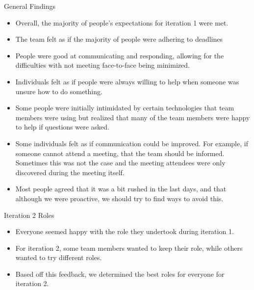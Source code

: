 \documentclass[final,hyperref={pdfpagelabels=false}]{beamer}
\begin{document}
\begin{frame}[t]
\begin{columns}[t]
\begin{column}{.465\textwidth}

\begin{block}{General Findings}

\begin{itemize}
\item Overall, the majority of people's expectations for iteration 1 were met.
\item The team felt as if the majority of people were adhering to deadlines
\item People were good at communicating and responding, allowing for the difficulties with not meeting face-to-face being minimized.
\item Individuals felt as if people were always willing to help when someone was unsure how to do something.
\item Some people were initially intimidated by certain technologies that team members were using but realized that many of the team members were happy to help if questions were asked.
\item Some individuals felt as if communication could be improved. For example, if someone cannot attend a meeting, that the team should be informed. Sometimes this was not the case and the meeting attendees were only discovered during the meeting itself.
\item Most people agreed that it was a bit rushed in the last days, and that although we were proactive, we should try to find ways to avoid this.
\end{itemize}
\end{block}







            
\begin{block}{Iteration 2 Roles}
\begin{itemize}
\item Everyone seemed happy with the role they undertook during iteration 1. 
\item For iteration 2, some team members wanted to keep their role, while others wanted to try different roles.
\item Based off this feedback, we determined the best roles for everyone for iteration 2.
\end{itemize}
\end{block}





\end{column}
\end{columns}
\end{frame}
\end{document}
